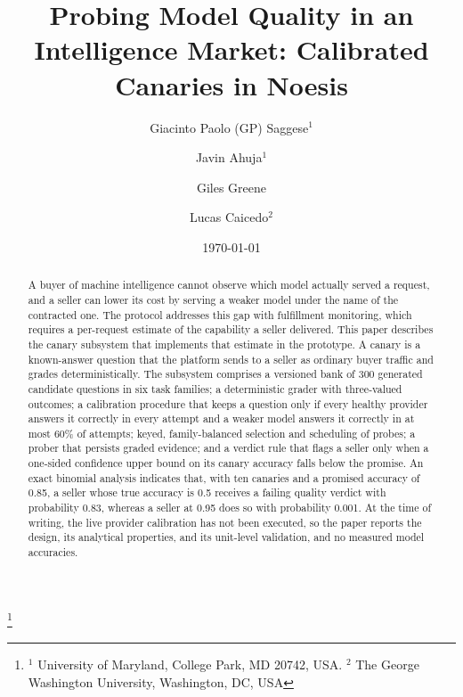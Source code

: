 \title{Probing Model Quality in an Intelligence Market: Calibrated Canaries in Noesis}

\author{Giacinto Paolo (GP) Saggese$^{1}$}
\author{Javin Ahuja$^{1}$}
\author{Giles Greene}
\author{Lucas Caicedo$^{2}$}
\thanks{$^{1}$ University of Maryland, College Park, MD 20742, USA.
$^{2}$ The George Washington University, Washington, DC, USA}

\date{\today}

\begin{abstract}
A buyer of machine intelligence cannot observe which model actually served a
request, and a seller can lower its cost by serving a weaker model under the
name of the contracted one. The \Noesis{} protocol addresses this gap with
fulfillment monitoring, which requires a per-request estimate of the capability
a seller delivered. This paper describes the canary subsystem that implements
that estimate in the \Noesis{} prototype. A canary is a known-answer question
that the platform sends to a seller as ordinary buyer traffic and grades
deterministically. The subsystem comprises a versioned bank of 300 generated
candidate questions in six task families; a deterministic grader with
three-valued outcomes; a calibration procedure that keeps a question only if
every healthy provider answers it correctly in every attempt and a weaker model
answers it correctly in at most 60\% of attempts; keyed, family-balanced
selection and scheduling of probes; a prober that persists graded evidence; and
a verdict rule that flags a seller only when a one-sided confidence upper bound
on its canary accuracy falls below the promise. An exact binomial analysis
indicates that, with ten canaries and a promised accuracy of 0.85, a seller
whose true accuracy is 0.5 receives a failing quality verdict with probability
0.83, whereas a seller at 0.95 does so with probability 0.001. At the time of
writing, the live provider calibration has not been executed, so the paper
reports the design, its analytical properties, and its unit-level validation,
and no measured model accuracies.
\end{abstract}

\maketitle

\setcounter{tocdepth}{2}
\tableofcontents

